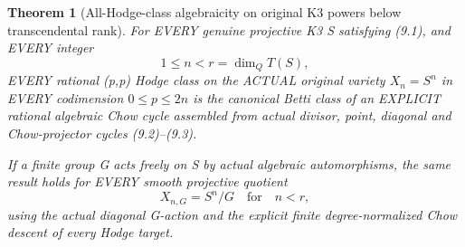 \documentclass[11pt]{article}
\newtheorem{theorem}{Theorem}[section]
\begin{document}
\begin{theorem}[All-Hodge-class algebraicity on original K3 powers below transcendental rank]
For EVERY genuine projective K3 S
satisfying (9.1), and EVERY integer
\[
 \boxed{1\le n<r=\dim_Q T(S),}                     \tag{9.4}
\]
EVERY rational (p,p) Hodge class on
the ACTUAL original variety \(X_n=S^n\)
in EVERY codimension \(0\le p\le2n\)
is the canonical Betti class of an
EXPLICIT rational algebraic Chow cycle
assembled from actual divisor, point,
diagonal and Chow-projector cycles
(9.2)--(9.3).

If a finite group G acts freely on S
by actual algebraic automorphisms,
the same result holds for EVERY
smooth projective quotient
\[
 \boxed{
 X_{n,G}=S^n/G\quad\text{for}\quad n<r,}
                                                               \tag{9.5}
\]
using the actual diagonal G-action and
the explicit finite degree-normalized
Chow descent of every Hodge target.
\end{theorem}
\end{document}
